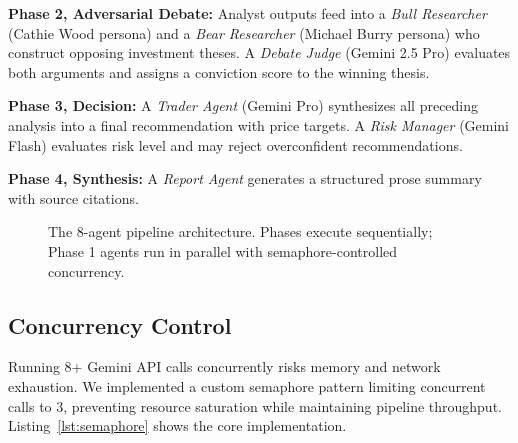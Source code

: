 \documentclass[conference]{IEEEtran}
\begin{document}
\textbf{Phase 2, Adversarial Debate:} Analyst outputs feed into a \textit{Bull Researcher} (Cathie Wood persona) and a \textit{Bear Researcher} (Michael Burry persona) who construct opposing investment theses. A \textit{Debate Judge} (Gemini 2.5 Pro) evaluates both arguments and assigns a conviction score to the winning thesis.

\textbf{Phase 3, Decision:} A \textit{Trader Agent} (Gemini Pro) synthesizes all preceding analysis into a final recommendation with price targets. A \textit{Risk Manager} (Gemini Flash) evaluates risk level and may reject overconfident recommendations.

\textbf{Phase 4, Synthesis:} A \textit{Report Agent} generates a structured prose summary with source citations.

\begin{figure}[htbp]
\centering
{}
\caption{The 8-agent pipeline architecture. Phases execute sequentially; Phase 1 agents run in parallel with semaphore-controlled concurrency.}
\label{fig:pipeline}
\end{figure}

\subsection{Concurrency Control}

Running 8+ Gemini API calls concurrently risks memory and network exhaustion. We implemented a custom semaphore pattern limiting concurrent calls to 3, preventing resource saturation while maintaining pipeline throughput. Listing~\ref{lst:semaphore} shows the core implementation.
\end{document}
